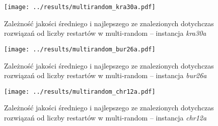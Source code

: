 \documentclass{article}
\begin{document}
			\begin{figure}[h]
				\texttt{[image: ../results/multirandom\_kra30a.pdf]}
				\caption{Zależność jakości średniego i najlepszego ze znalezionych dotychczas rozwiązań od liczby restartów w multi-random -- instancja \emph{kra30a}\label{fig:mr.kra30a}}		
			\end{figure}
			\begin{figure}[h]
				\texttt{[image: ../results/multirandom\_bur26a.pdf]}
				\caption{Zależność jakości średniego i najlepszego ze znalezionych dotychczas rozwiązań od liczby restartów w multi-random -- instancja \emph{bur26a}\label{fig:mr.bur26a}}		
			\end{figure}
			\begin{figure}[h]
				\texttt{[image: ../results/multirandom\_chr12a.pdf]}
				\caption{Zależność jakości średniego i najlepszego ze znalezionych dotychczas rozwiązań od liczby restartów w multi-random -- instancja \emph{chr12a}\label{fig:mr.chr12a}}		
			\end{figure}
\end{document}
